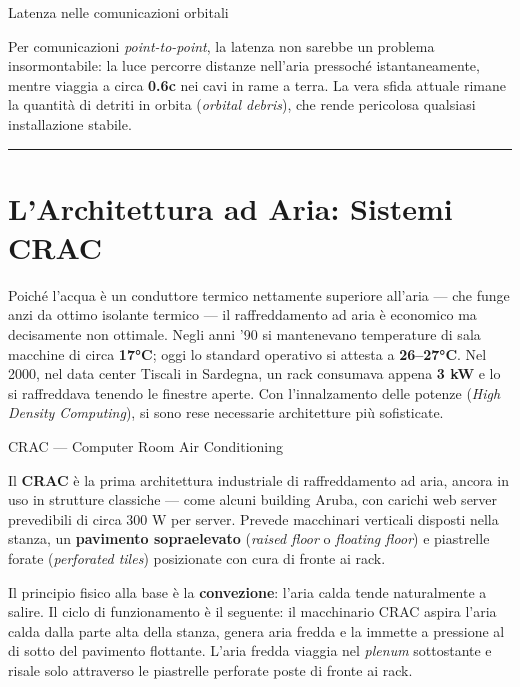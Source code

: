 \documentclass[
  italian,
  openany]{book}
\begin{document}
\begin{calloutnote}{Latenza nelle comunicazioni orbitali}

Per comunicazioni \emph{point-to-point}, la latenza non sarebbe un
problema insormontabile: la luce percorre distanze nell'aria pressoché
istantaneamente, mentre viaggia a circa \textbf{0.6c} nei cavi in rame a
terra. La vera sfida attuale rimane la quantità di detriti in orbita
(\emph{orbital debris}), che rende pericolosa qualsiasi installazione
stabile.

\end{calloutnote}

\begin{center}\rule{0.5\linewidth}{0.5pt}\end{center}

\section{L'Architettura ad Aria: Sistemi
CRAC}\label{larchitettura-ad-aria-sistemi-crac}

Poiché l'acqua è un conduttore termico nettamente superiore all'aria ---
che funge anzi da ottimo isolante termico --- il raffreddamento ad aria
è economico ma decisamente non ottimale. Negli anni '90 si mantenevano
temperature di sala macchine di circa \textbf{17°C}; oggi lo standard
operativo si attesta a \textbf{26--27°C}. Nel 2000, nel data center
Tiscali in Sardegna, un rack consumava appena \textbf{3 kW} e lo si
raffreddava tenendo le finestre aperte. Con l'innalzamento delle potenze
(\emph{High Density Computing}), si sono rese necessarie architetture
più sofisticate.

\begin{calloutdefinition}{CRAC — Computer Room Air Conditioning}

Il \textbf{CRAC} è la prima architettura industriale di raffreddamento
ad aria, ancora in uso in strutture classiche --- come alcuni building
Aruba, con carichi web server prevedibili di circa 300 W per server.
Prevede macchinari verticali disposti nella stanza, un \textbf{pavimento
sopraelevato} (\emph{raised floor} o \emph{floating floor}) e piastrelle
forate (\emph{perforated tiles}) posizionate con cura di fronte ai rack.

\end{calloutdefinition}

Il principio fisico alla base è la \textbf{convezione}: l'aria calda
tende naturalmente a salire. Il ciclo di funzionamento è il seguente: il
macchinario CRAC aspira l'aria calda dalla parte alta della stanza,
genera aria fredda e la immette a pressione al di sotto del pavimento
flottante. L'aria fredda viaggia nel \emph{plenum} sottostante e risale
solo attraverso le piastrelle perforate poste di fronte ai rack.
\end{document}
